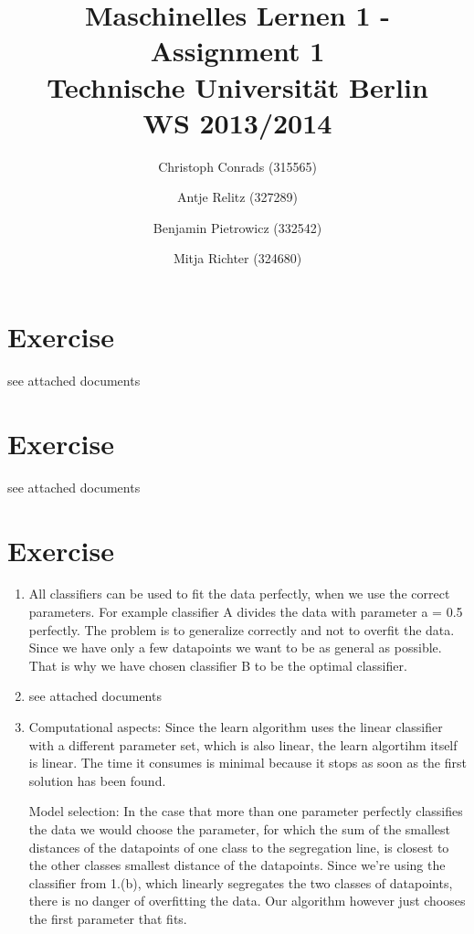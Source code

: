\documentclass[a4paper]{article}
\begin{document}
\title{Maschinelles Lernen 1 - Assignment 1\\
\small{Technische Universität Berlin\\
WS 2013/2014}}

\author{\small{Christoph Conrads (315565)}\and \small{Antje Relitz (327289)}  \and \small{Benjamin Pietrowicz (332542)} \and \small{Mitja Richter (324680)} } 

\maketitle

\section{Exercise}
see attached documents
\section{Exercise}
see attached documents
\section{Exercise}
\begin{enumerate}[label={(\alph*)}]
	\item All classifiers can be used to fit the data perfectly, when we use the correct parameters.
For example classifier A divides the data with parameter a = 0.5 perfectly.
The problem is to generalize correctly and not to overfit the data.
Since we have only a few datapoints we want to be as general as possible.
That is why we have chosen classifier B to be the optimal classifier.
	\item see attached documents
	\item Computational aspects:
Since the learn algorithm uses the linear classifier with a different parameter set, which is also linear,
the learn algortihm itself is linear. The time it consumes is minimal because it stops as soon as the first
solution has been found.

Model selection: In the case that more than one parameter perfectly classifies the data we would choose the parameter, for which the sum of the smallest distances of the datapoints of one class to the segregation line, is closest to the other classes smallest distance of the datapoints. Since we're using the classifier from 1.(b), which linearly segregates the two classes of datapoints, there is no danger of overfitting the data. Our algorithm however just chooses the first parameter that fits.
\end{enumerate}
\end{document}
